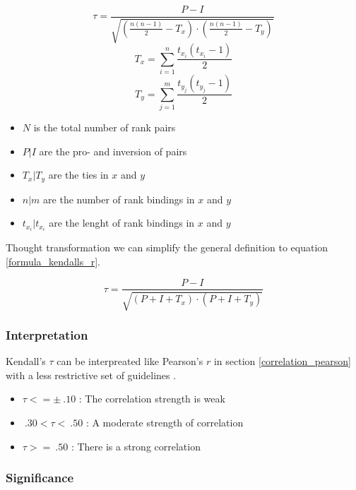 \documentclass[a4paper,12pt]{report}
\begin{document}
\begin{equation}
\label{formula_kendalls_r}
	\tau = \frac{P-I}{\sqrt{(\frac{n(n-1)}{2}-T_x) \cdot (\frac{n(n-1)}{2}-T_y)}}
\end{equation}
\begin{equation}
\label{formula_kendalls_r}
	T_x = \sum_{i=1}^n \frac{t_{x_i}(t_{x_i}-1)}{2}
\end{equation}
\begin{equation}
\label{formula_kendalls_r}
	T_y = \sum_{j=1}^m \frac{t_{y_j}(t_{y_j}-1)}{2}
\end{equation}
\smallskip

\begin{itemize}
	\setlength\itemsep{0.1em}	
	\item[] $N$ is the total number of rank pairs 
	\item[] $P | I$ are the pro- and inversion of pairs
	\item[] $T_x | T_y$ are the ties in $x$ and $y$
	\item[] $n | m$ are the number of rank bindings in $x$ and $y$
	\item[] $t_{x_i} | t_{x_i}$ are the lenght of rank bindings in $x$ and $y$
\end{itemize}

\bigskip

Thought transformation we can simplify the general definition to equation \ref{formula_kendalls_r}.

\begin{equation}
\label{formula_kendalls_r}
	\tau = \frac{P-I}{\sqrt{(P+I+T_x) \cdot (P+I+T_y)}}
\end{equation}

\subsubsection{Interpretation}
Kendall's $\tau$ can be interpreated like Pearson's $r$ in section \ref{correlation_pearson} with a less restrictive set of guidelines \cite{Regber2016}.

\begin{itemize}
	\item $\tau <= \pm \: .10$ : The correlation strength is weak
	\item $\: .30 < \tau < \: .50$ : A moderate strength of correlation
	\item $\tau >= \: .50$ : There is a strong correlation
\end{itemize}

\subsubsection{Significance}
\end{document}
